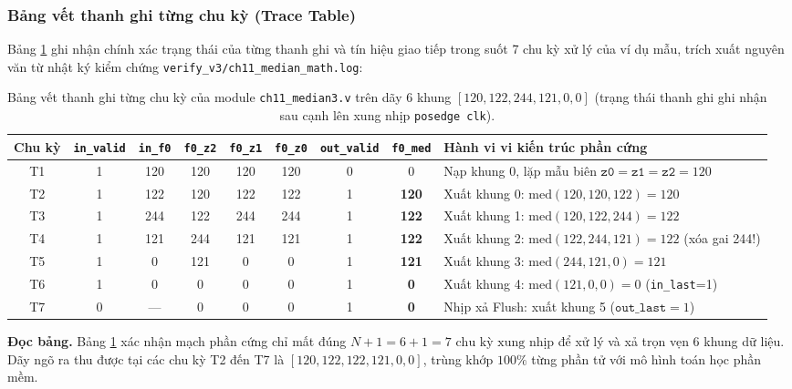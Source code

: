 \subsubsection*{Bảng vết thanh ghi từng chu kỳ (Trace Table)}
Bảng \ref{tab:ch11_trace} ghi nhận chính xác trạng thái của từng thanh ghi và tín hiệu giao tiếp trong suốt 7 chu kỳ xử lý của ví dụ mẫu, trích xuất nguyên văn từ nhật ký kiểm chứng \texttt{verify\_v3/ch11\_median\_math.log}:

\begin{table}[htbp]
\centering
\footnotesize
\setlength{\tabcolsep}{3pt}
\caption{Bảng vết thanh ghi từng chu kỳ của module \texttt{ch11\_median3.v} trên dãy 6 khung $[120, 122, 244, 121, 0, 0]$ (trạng thái thanh ghi ghi nhận sau cạnh lên xung nhịp \texttt{posedge clk}).}
\label{tab:ch11_trace}
\begin{tabular}{cccccccc>{\raggedright\arraybackslash}p{4.8cm}}
\toprule
\textbf{Chu kỳ} & \texttt{in\_valid} & \texttt{in\_f0} & \texttt{f0\_z2} & \texttt{f0\_z1} & \texttt{f0\_z0} & \texttt{out\_valid} & \texttt{f0\_med} & \textbf{Hành vi vi kiến trúc phần cứng} \\
\midrule
T1 & 1 & 120 & 120 & 120 & 120 & 0 & 0 & Nạp khung 0, lặp mẫu biên $\texttt{z0}=\texttt{z1}=\texttt{z2}=120$ \\
T2 & 1 & 122 & 120 & 122 & 122 & 1 & \textbf{120} & Xuất khung 0: $\text{med}(120, 120, 122) = 120$ \\
T3 & 1 & 244 & 122 & 244 & 244 & 1 & \textbf{122} & Xuất khung 1: $\text{med}(120, 122, 244) = 122$ \\
T4 & 1 & 121 & 244 & 121 & 121 & 1 & \textbf{122} & Xuất khung 2: $\text{med}(122, 244, 121) = 122$ (xóa gai 244!) \\
T5 & 1 & 0   & 121 & 0   & 0   & 1 & \textbf{121} & Xuất khung 3: $\text{med}(244, 121, 0) = 121$ \\
T6 & 1 & 0   & 0   & 0   & 0   & 1 & \textbf{0}   & Xuất khung 4: $\text{med}(121, 0, 0) = 0$ (\texttt{in\_last}=1) \\
T7 & 0 & --- & 0   & 0   & 0   & 1 & \textbf{0}   & Nhịp xả Flush: xuất khung 5 ($\texttt{out\_last}=1$) \\
\bottomrule
\end{tabular}
\end{table}

\textbf{Đọc bảng.} Bảng \ref{tab:ch11_trace} xác nhận mạch phần cứng chỉ mất đúng $N + 1 = 6 + 1 = 7\text{ chu kỳ xung nhịp}$ để xử lý và xả trọn vẹn $6$ khung dữ liệu. Dãy ngõ ra thu được tại các chu kỳ T2 đến T7 là $[120, 122, 122, 121, 0, 0]$, trùng khớp $100\%$ từng phần tử với mô hình toán học phần mềm.

